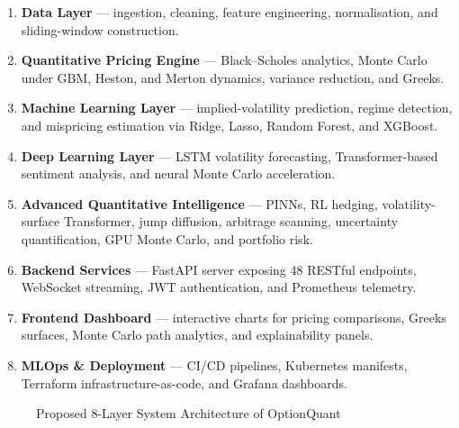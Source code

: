 \documentclass[conference]{IEEEtran}
\begin{document}
\begin{enumerate}
    \item \textbf{Data Layer} --- ingestion, cleaning, feature engineering, normalisation, and sliding-window construction.
    \item \textbf{Quantitative Pricing Engine} --- Black--Scholes analytics, Monte Carlo under GBM, Heston, and Merton dynamics, variance reduction, and Greeks.
    \item \textbf{Machine Learning Layer} --- implied-volatility prediction, regime detection, and mispricing estimation via Ridge, Lasso, Random Forest, and XGBoost.
    \item \textbf{Deep Learning Layer} --- LSTM volatility forecasting, Transformer-based sentiment analysis, and neural Monte Carlo acceleration.
    \item \textbf{Advanced Quantitative Intelligence} --- PINNs, RL hedging, volatility-surface Transformer, jump diffusion, arbitrage scanning, uncertainty quantification, GPU Monte Carlo, and portfolio risk.
    \item \textbf{Backend Services} --- FastAPI server exposing 48 RESTful endpoints, WebSocket streaming, JWT authentication, and Prometheus telemetry.
    \item \textbf{Frontend Dashboard} --- interactive charts for pricing comparisons, Greeks surfaces, Monte Carlo path analytics, and explainability panels.
    \item \textbf{MLOps \& Deployment} --- CI/CD pipelines, Kubernetes manifests, Terraform infrastructure-as-code, and Grafana dashboards.
\end{enumerate}

\begin{figure}[htbp]
\centering
{}
\caption{Proposed 8-Layer System Architecture of OptionQuant}
\label{fig:architecture}
\end{figure}
\end{document}
